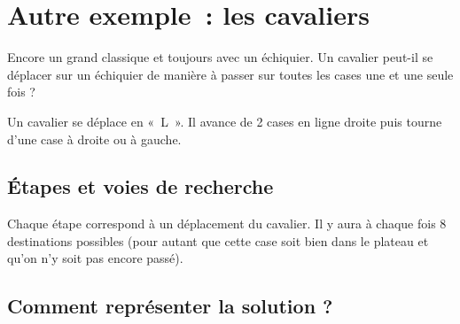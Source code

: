 		
		
		
\section{Autre exemple~: les cavaliers}

	Encore un grand classique et toujours avec un échiquier. 
	Un cavalier peut-il se déplacer sur un échiquier de manière à
	passer sur toutes les cases une et une seule fois ?

	Un cavalier se déplace en «~L~». Il avance de 2 cases 
	en ligne droite puis tourne d'une case à droite ou à
	gauche.

	\subsection{Étapes et voies de recherche}

		Chaque étape correspond à un déplacement du cavalier. Il y aura 
		à chaque fois 8 destinations possibles (pour autant que
		cette case soit bien dans le plateau et qu'on n'y soit pas encore passé).

	\subsection{Comment représenter la solution ?}

